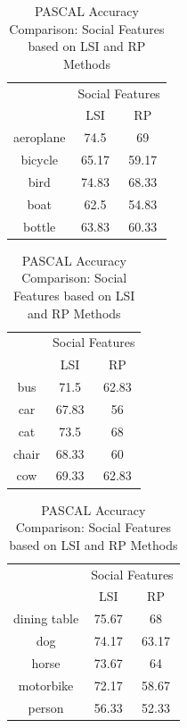 \begin{table}[!ht]
\caption{ PASCAL Accuracy Comparison: Social Features based on LSI and RP Methods} %
\centering
\begin{tabular}{|c|c|c|}
 \hline
{\multirow{2}{*}{Labels}} & \multicolumn{2}{|c|}{Social Features} \\
\cline{2-3}
 & LSI & RP \\  [1ex] \hline
aeroplane & 74.5 & 69 \\  [1ex] \hline
bicycle & 65.17 & 59.17 \\  [1ex] \hline
bird & 74.83 & 68.33 \\  [1ex] \hline
boat & 62.5 & 54.83 \\  [1ex] \hline
bottle & 63.83 & 60.33 \\  [1ex] \hline
\end{tabular}
 \hspace{1em}\vspace*{0.5cm}
 \begin{tabular}{|c|c|c|}
  \hline
{\multirow{2}{*}{Labels}} & \multicolumn{2}{|c|}{Social Features} \\ \cline{2-3}
 & LSI & RP \\ \hline
bus & 71.5 & 62.83 \\  [1ex] \hline
car & 67.83 & 56 \\  [1ex] \hline
cat & 73.5 & 68 \\  [1ex] \hline
chair & 68.33 & 60 \\  [1ex] \hline
cow & 69.33 & 62.83 \\  [1ex] \hline
\end{tabular}
 \hspace{1em}\vspace*{0.5cm}
 \begin{tabular}{|c|c|c|}
  \hline
{\multirow{2}{*}{Labels}} & \multicolumn{2}{|c|}{Social Features} \\ \cline{2-3}
 & LSI & RP \\ \hline
dining table & 75.67 & 68 \\  [1ex] \hline
dog & 74.17 & 63.17 \\  [1ex] \hline
horse & 73.67 & 64 \\  [1ex] \hline
motorbike & 72.17 & 58.67 \\  [1ex] \hline
person & 56.33 & 52.33 \\  [1ex] \hline
\end{tabular}
 \hspace{1em}\vspace*{0.5cm}

\end{table}
